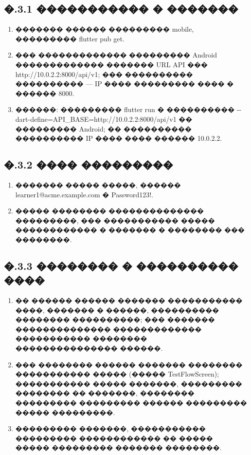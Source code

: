 \subsection*{�.3.1 ����������� � �������}

\begin{enumerate}
  \item ������� ������ ��������� mobile, ��������� flutter pub get.
  \item ��� ������������� ��������� Android ������������� ������� URL API ��� http://10.0.2.2:8000/api/v1; ��� ���������� ���������� --- IP ���� ��������� ���� � ������ 8000.
  \item ������: ��������� flutter run � ���������� {-}{-}dart-define=API\_BASE=http://10.0.2.2:8000/api/v1 �� ��������� Android; �� ���������� ���������� IP ���� ���� ������ 10.0.2.2.
\end{enumerate}

\subsection*{�.3.2 ���� ���������}

\begin{enumerate}
  \item ������� ����� �����, ������ learner1@acme.example.com � Password123!.
  \item ����� �������� �������������� ���������, ��� ����������� ����� ������������ � ������� � �������� ��� ��������.
\end{enumerate}

\subsection*{�.3.3 �������� � ���������� ����}

\begin{enumerate}
  \item �� ������ ������ ������� ����������� ����, ������� � ������, ���������� �������� ����������; ��� ������� �������������� ������������� ����������� �������� ��������������� ������.
  \item ��� �������� ������ ������� �������� ����������� ����� (����� TestFlowScreen); ����������� ����� �������, ��������� �������� �� �������, �������� ��������� ��������� ������ ��������� ����� ���������.
  \item ��������� �������, ����������� ��������� ������������ �� ����� ����� ��������� ������� ��������.
\end{enumerate}

